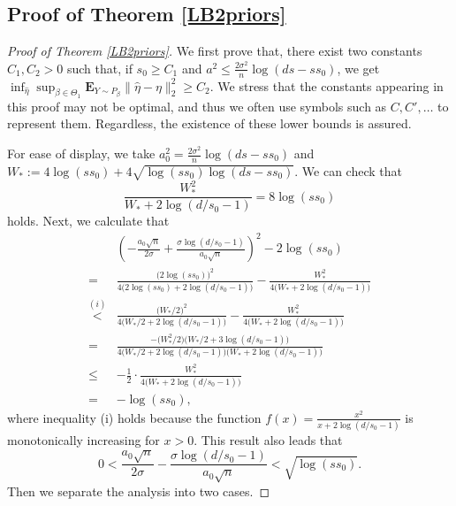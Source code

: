 \documentclass[12pt]{article}
\newtheorem{proof}{Proof}
\begin{document}
\begin{appendix}
\subsection{Proof of Theorem \ref{LB2priors}}
\begin{proof}[Proof of Theorem \ref{LB2priors}]

We first prove that, there exist two constants $C_1, C_2 >0$ such that, if $s_0 \ge C_1$ and $a^2 \le \frac{2\sigma^2}{n} \log(ds-ss_0)$, we get $\inf_{\hat \eta} \sup_{\beta \in {\Theta}_1} \mathbf{E}_{Y\sim P_\beta} \| \hat \eta - \eta \|_2^2 \ge C_2$.
We stress that the constants appearing in this proof may not be optimal, and thus we often use symbols such as $C, C', \ldots$ to represent them. 
Regardless, the existence of these lower bounds is assured.


For ease of display, we take $a_0^2 =  \frac{2\sigma^2}{n} \log(ds-ss_0) $ and $W_* := 4\log(ss_0) + 4 \sqrt{\log (ss_0) \log(ds-ss_0)}$.
We can check that 
$$
\frac{W_*^2}{ W_* + 2\log(d/s_0-1) } = 8 \log(ss_0)
$$
holds. Next, we calculate that
\begin{equation}\label{eq: y}
\begin{aligned}
&\left( -\frac{a_0\sqrt n}{2\sigma} +\frac{\sigma\log(d/s_0-1)}{a_0\sqrt n} \right)^2-2\log(ss_0)\\
=& \frac{\big(2\log(ss_0)\big)^2}{ 4\big(2\log(ss_0) +2\log(d/s_0-1) \big) } 
  -\frac{W_*^2}{ 4\big( W_* + 2\log(d/s_0-1) \big) }\\
\overset{(i)}<& \frac{\big(W_*/2\big)^2}{ 4\big(W_*/2 +2\log(d/s_0-1) \big) } 
  -\frac{W_*^2}{ 4\big( W_* + 2\log(d/s_0-1) \big) }\\
=& \frac{-\big(W_*^2/2\big) \big(W_*/2 + 3\log(d/s_0-1)\big) }
{ 4\big(W_*/2 +2\log(d/s_0-1) \big)  \big( W_* + 2\log(d/s_0-1) \big)}\\
\le & -\frac12 \cdot \frac{ W_*^2 }{4 \big( W_* + 2\log(d/s_0-1) \big)} \\
=& -\log(ss_0),
\end{aligned}
\end{equation}
where inequality (i) holds because the function $f(x) = \frac{x^2}{x + 2\log(d/s_0 - 1)}$ is monotonically increasing for $x > 0 $.
This result also leads that $$0< \frac{a_0\sqrt n}{2\sigma} - \frac{\sigma\log(d/s_0-1)}{a_0\sqrt n}  < \sqrt{\log(ss_0)}.$$
Then we separate the analysis into two cases.


\end{proof}
\end{appendix}
\end{document}
